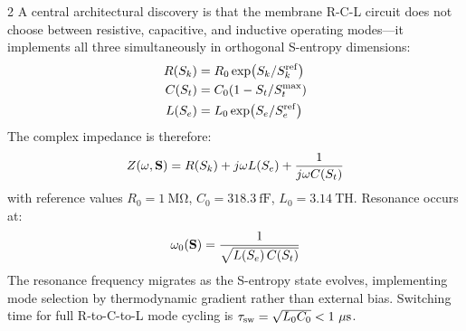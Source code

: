 \begin{multicols}{2}
A central architectural discovery is that the membrane R-C-L circuit does not choose between resistive, capacitive, and inductive operating modes---it implements all three simultaneously in orthogonal S-entropy dimensions:
\begin{align}
R(S_k) &= R_0 \exp(S_k / S_k^{\mathrm{ref}}) \label{eq:ch11_R}\\
C(S_t) &= C_0\!\left(1 - S_t/S_t^{\mathrm{max}}\right) \label{eq:ch11_C}\\
L(S_e) &= L_0 \exp(S_e / S_e^{\mathrm{ref}}) \label{eq:ch11_L}
\end{align}
The complex impedance is therefore:
\begin{equation}
Z(\omega, \mathbf{S}) = R(S_k) + j\omega L(S_e) + \frac{1}{j\omega C(S_t)}
\label{eq:ch11_impedance}
\end{equation}
with reference values $R_0 = 1\ \mathrm{M\Omega}$, $C_0 = 318.3\ \mathrm{fF}$, $L_0 = 3.14\ \mathrm{TH}$. Resonance occurs at:
\begin{equation}
\omega_0(\mathbf{S}) = \frac{1}{\sqrt{L(S_e)\,C(S_t)}}
\label{eq:ch11_resonance}
\end{equation}
The resonance frequency migrates as the S-entropy state evolves, implementing mode selection by thermodynamic gradient rather than external bias. Switching time for full R-to-C-to-L mode cycling is $\tau_{\mathrm{sw}} = \sqrt{L_0 C_0} < 1\ \mu\mathrm{s}$.

\end{multicols}

